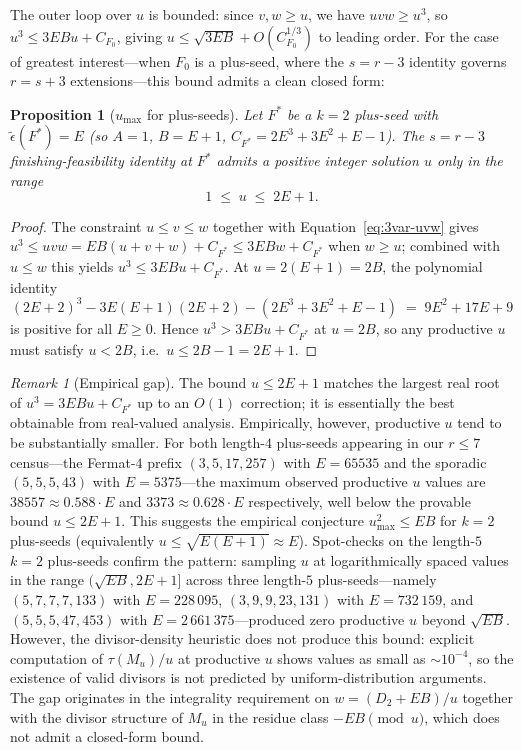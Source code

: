 \documentclass[11pt]{article}
\newtheorem{proposition}[theorem]{Proposition}
\theoremstyle{definition}
\theoremstyle{remark}
\newtheorem{remark}[theorem]{Remark}
\newcommand{\eps}{\tilde{\epsilon}}
\begin{document}
The outer loop over $u$ is bounded: since $v, w \ge u$, we have
$uvw \ge u^3$, so $u^3 \le 3 EB u + C_{F_0}$, giving
$u \le \sqrt{3 EB} + O(C_{F_0}^{1/3})$ to leading order.  For the
case of greatest interest---when $F_0$ is a plus-seed, where the
$s = r - 3$ identity governs $r = s + 3$ extensions---this bound
admits a clean closed form:

\begin{proposition}[$u_{\max}$ for plus-seeds]\label{prop:umax-plusseed}
Let $F^*$ be a $k = 2$ plus-seed with $\eps(F^*) = E$ (so $A = 1$,
$B = E + 1$, $C_{F^*} = 2E^3 + 3E^2 + E - 1$).  The
$s = r - 3$ finishing-feasibility identity at $F^*$ admits a positive
integer solution $u$ only in the range
\[
  1 \;\le\; u \;\le\; 2 E + 1.
\]
\end{proposition}

\begin{proof}
The constraint $u \le v \le w$ together with
Equation~\eqref{eq:3var-uvw} gives
$u^3 \le uvw = EB(u + v + w) + C_{F^*} \le 3 EB w + C_{F^*}$ when
$w \ge u$; combined with $u \le w$ this yields
$u^3 \le 3 EB u + C_{F^*}$.  At $u = 2(E + 1) = 2B$, the polynomial
identity
\[
  (2E + 2)^3 - 3 E (E+1)(2E + 2) - (2E^3 + 3E^2 + E - 1)
  \;=\; 9 E^2 + 17 E + 9
\]
is positive for all $E \ge 0$.  Hence $u^3 > 3 EB u + C_{F^*}$ at
$u = 2B$, so any productive $u$ must satisfy $u < 2B$, i.e.\
$u \le 2B - 1 = 2 E + 1$.
\end{proof}

\begin{remark}[Empirical gap]\label{rem:umax-empirical}
The bound $u \le 2E + 1$ matches the largest real root of $u^3 = 3EBu
+ C_{F^*}$ up to an $O(1)$ correction; it is essentially the best
obtainable from real-valued analysis.  Empirically, however,
productive $u$ tend to be substantially smaller.  For both length-$4$
plus-seeds appearing in our $r \le 7$ census---the Fermat-$4$ prefix
$(3, 5, 17, 257)$ with $E = 65535$ and the sporadic $(5, 5, 5, 43)$
with $E = 5375$---the maximum observed productive $u$ values are
$38557 \approx 0.588 \cdot E$ and $3373 \approx 0.628 \cdot E$
respectively, well below the provable bound $u \le 2E + 1$.  This
suggests the empirical conjecture $u_{\max}^2 \le EB$ for $k = 2$
plus-seeds (equivalently $u \le \sqrt{E(E+1)} \approx E$).
Spot-checks on the length-$5$ $k = 2$ plus-seeds confirm the pattern:
sampling $u$ at logarithmically spaced values in the range $(\sqrt{EB},
2E + 1]$ across three length-$5$ plus-seeds---namely $(5, 7, 7, 7, 133)$
with $E = 228\,095$, $(3, 9, 9, 23, 131)$ with $E = 732\,159$, and
$(5, 5, 5, 47, 453)$ with $E = 2\,661\,375$---produced zero
productive $u$ beyond $\sqrt{EB}$.  However, the divisor-density
heuristic does not produce
this bound: explicit computation of $\tau(M_u)/u$ at productive $u$
shows values as small as $\sim 10^{-4}$, so the existence of valid
divisors is not predicted by uniform-distribution arguments.  The
gap originates in the integrality requirement on $w = (D_2 + EB)/u$
together with the divisor structure of $M_u$ in the residue class
$-EB \pmod u$, which does not admit a closed-form bound.
\end{remark}
\end{document}
